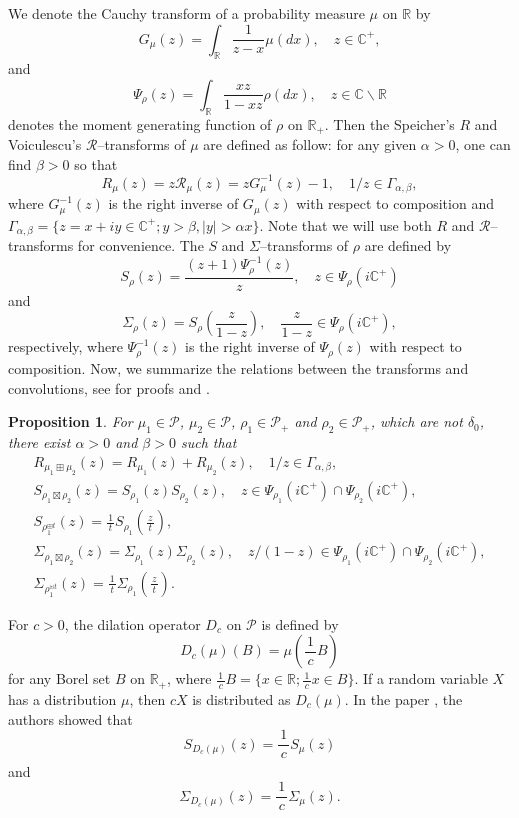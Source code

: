 \documentclass[12pt]{amsart}
\newtheorem{prop}[thm]{Proposition}
\theoremstyle{definition}
\numberwithin{equation}{section}
\begin{document}
We denote the Cauchy transform of a probability measure $\mu$ on ${\mathbb{R}}$ by
\[
G_{\mu}(z) = \int_{\mathbb{R}}\frac{1}{z-x}\mu(dx), \quad z \in {\mathbb{C}}^+ ,
\]
and 
\[
\Psi_{\rho}(z) = \int_{\mathbb{R}}\frac{xz}{1-xz}\rho(dx), \quad z \in {\mathbb{C}} \backslash {\mathbb{R}}
\] 
denotes
the moment generating function of $\rho$ on ${\mathbb{R}}_+$.
Then the Speicher's $R$ and Voiculescu's $\mathcal{R}$--transforms of $\mu$ are defined as follow:
for any given $\alpha>0$, one can find $\beta>0$ so that 
\[
R_{\mu}(z)= z \mathcal{R}_{\mu}(z)
= z G_{\mu}^{-1}(z)-1, \quad 1/z \in \Gamma_{\alpha,\beta},
\]
where $G_{\mu}^{-1}(z)$ is the right inverse of $G_{\mu}(z)$ with respect to 
composition and 
$\Gamma_{\alpha,\beta}=\{ z=x+iy \in {\mathbb{C}}^{+}; y>\beta, |y| >\alpha x\}$.
Note that we will use both $R$ and $\mathcal{R}$--transforms for convenience.
The $S$ and $\Sigma$--transforms of $\rho$ are defined by
\[
S_{\rho}(z)=\frac{(z+1)\Psi_{\rho}^{-1}(z)}{z}, \quad z \in \Psi_{\rho}(i{\mathbb{C}}^+)
\]
and 
\[
\Sigma_{\rho}(z)=S_{\rho}\left(\frac{z}{1-z}\right),
\quad \frac{z}{1-z} \in \Psi_{\rho}(i{\mathbb{C}}^+),
\]
respectively, where $\Psi_{\rho}^{-1}(z)$ is the right inverse of $\Psi_{\rho}(z)$
with respect to composition.
Now, we summarize the relations between the transforms and convolutions, see for proofs \cite{BeVo93} and \cite{BeNi09}.
\begin{prop}\label{basic}
	For $\mu_1\in\mathcal{P}$, $\mu_2\in\mathcal{P}$, $\rho_1\in\mathcal{P}_+$ and 
	$\rho_2\in\mathcal{P}_+$, which are not $\delta_{0}$, there exist $\alpha>0$ and $\beta>0$ such that
		\begin{align*}
		&R_{\mu_1 \boxplus \mu_2} (z)=
		R_{\mu_1}(z)+R_{\mu_2} (z),
		\quad 1/z \in \Gamma_{\alpha,\beta},&\\
		&S_{\rho_1 \boxtimes \rho_2}(z)
		=S_{\rho_1}(z)S_{\rho_2}(z),\quad z \in \Psi_{\rho_1}(i{\mathbb{C}}^+)\cap\Psi_{\rho_2}(i{\mathbb{C}}^+),&\\
		&S_{\rho_1^{\boxplus t}}(z)
		=\frac{1}{_{\,}t_{\,}} S_{\rho_1}\left(\frac{z}{_{\,}t_{\,}}\right),&\\
		&\Sigma_{\rho_1 \boxtimes \rho_2}(z)
		=\Sigma_{\rho_1}(z)\Sigma_{\rho_2}(z),\quad z/(1-z) \in \Psi_{\rho_1}(i{\mathbb{C}}^+)\cap\Psi_{\rho_2}(i{\mathbb{C}}^+), &\\
		&\Sigma_{\rho_1^{\uplus t}}(z)
		=\frac{1}{_{\,}t_{\,}} \Sigma_{\rho_1}\left(\frac{z}{_{\,}t_{\,}}\right).&
		\end{align*}
\end{prop} 
For $c > 0$, the dilation operator $D_c$ on $\mathcal{P}$ is defined by 
	\[
	D_c(\mu) (B)= \mu\left(\frac{1}{_{\,}c_{\,}}B\right) 
	\]
for any Borel set $B$ on ${\mathbb{R}}_+$,
where $\frac{1}{\, c \,}B=\{x\in{\mathbb{R}} ; \frac{1}{\,c\,}x \in B \}$.
If a random variable $X$ has a distribution $\mu$, then $cX$ is distributed as $D_{c}(\mu)$.
In the paper \cite{BeNi09}, the authors showed that
	\[
	S_{D_c(\mu)}(z) = \frac{1}{_{\,}c_{\,}}S_{\mu}(z)
	\]
and
	\[
	\Sigma_{D_c(\mu)}(z) = \frac{1}{_{\,}c_{\,}}\Sigma_{\mu}(z).
	\]
	
\end{document}
